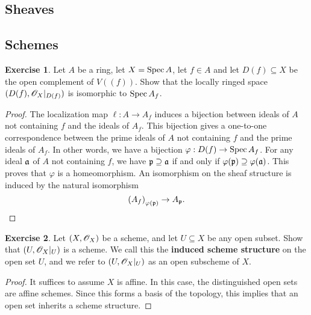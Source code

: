 \documentclass[]{pcmi}
\theoremstyle{plain}
\theoremstyle{definition}
\newtheorem{Exercise}{Exercise}
\theoremstyle{remark}
\begin{document}
\subsection{Sheaves}

\subsection{Schemes}


\begin{Exercise}
    Let $A$ be a ring, let $X = \operatorname{Spec} A$, let $f \in A$ and let $D(f) \subseteq X$ be the open complement of $V((f))$. Show that the locally ringed space $(D(f), \mathscr{O}_X|_{D(f)})$ is isomorphic to $\operatorname{Spec} A_f$. 
\end{Exercise}

\begin{proof}
    The localization map $\ell : A \to A_f$ induces a bijection between ideals of $A$ not containing $f$ and the ideals of $A_f$. This bijection gives a one-to-one correspondence between the prime ideals of $A$ not containing $f$ and the prime ideals of $A_f$. In other words, we have a bijection $\varphi : D(f) \to \operatorname{Spec} A_f$. For any ideal $\mathfrak{a}$ of $A$ not containing $f$, we have $\mathfrak{p} \supseteq \mathfrak{a}$ if and only if $\varphi(\mathfrak{p}) \supseteq \varphi(\mathfrak{a})$. This proves that $\varphi$ is a homeomorphism. An isomorphism on the sheaf structure is induced by the natural isomorphism 
    \[
        \left( A_f \right)_{\varphi(\mathfrak{p})} \to A_{\mathfrak{p}}. 
    \]
\end{proof}

\begin{Exercise}
    Let $(X, \mathscr{O}_X)$ be a scheme, and let $U \subseteq X$ be any open subset. Show that $\left (U, \mathscr{O}_X|_U \right )$ is a scheme. We call this the \textbf{induced scheme structure} on the open set $U$, and we refer to $\left( U, \mathscr{O}_X|_U \right)$ as an open subscheme of $X$. 
\end{Exercise}

\begin{proof}
    It suffices to assume $X$ is affine. In this case, the distinguished open sets are affine schemes. Since this forms a basis of the topology, this implies that an open set inherits a scheme structure. 
\end{proof}
\end{document}
